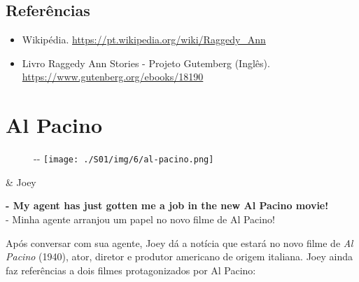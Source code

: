 \hypertarget{referuxeancias-2}{%
\subsection{Referências}\label{referuxeancias-2}}

\begin{itemize}
\tightlist
\item
  \sloppy Wikipédia. \url{https://pt.wikipedia.org/wiki/Raggedy_Ann}
\item
  \sloppy Livro Raggedy Ann Stories - Projeto Gutemberg (Inglês). \url{https://www.gutenberg.org/ebooks/18190}
\end{itemize}

\hypertarget{al-pacino}{%
\section{Al Pacino}\label{al-pacino}}

\begin{figure}[!ht]
  \begin{adjustwidth}{-\oddsidemargin-1in}{-\rightmargin}
    \centering
    \texttt{[image: ./S01/img/6/al-pacino.png]}
  \end{adjustwidth}
\end{figure}

\begin{tcolorbox}[enhanced,center upper,
    drop fuzzy shadow southeast, boxrule=0.3pt,
    lower separated=false, breakable,
    colframe=black!30!dialogoBorder,colback=white]
\begin{minipage}[c]{0.16\linewidth}
   & \centering \scriptsize{Joey}
\end{minipage}
\hfill
\begin{minipage}[c]{0.8\linewidth}
  \textbf{- My agent has just gotten me a job in the new Al Pacino movie!}\\
  - Minha agente arranjou um papel no novo filme de Al Pacino!
\end{minipage}
\end{tcolorbox}

Após conversar com sua agente, Joey dá a notícia que estará no novo
filme de \emph{Al Pacino} (1940), ator, diretor e produtor americano de
origem italiana. Joey ainda faz referências a dois filmes protagonizados
por Al Pacino:

